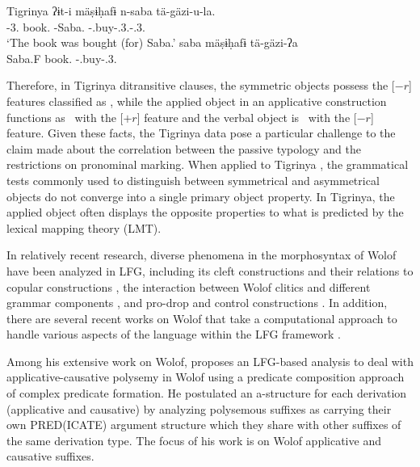 \documentclass[output=paper,hidelinks]{langscibook}
\begin{document}
\ea\label{ex:African:30} Tigrinya
\ea\label{ex:African:30a}
    \gll  ʔɨt-i mäṣɨḥafɨ n-saba tä-gäzi-u-la.\\
      {\DEF}-3{\M.\SG} book.{\SG}   \OBL-Saba.{\F}    {\PASS}-{\PRF}.buy-.3{\M.\SG}-.3{\F.\SG}  \\
    \glt ‘The book was bought (for) Saba.’
\ex\label{ex:African:30b}
     \gll *saba mäṣɨḥafɨ tä-gäzi-ʔa\\
     Saba.F book.{\SG}   {\PASS}-{\PRF}.buy-.3{\F.\SG}\\
\z
\z

Therefore, in Tigrinya ditransitive clauses, the symmetric objects possess the [$-r$] features classified as , while the applied object in an applicative construction functions as \OBJTHETA\ with the [$+r$] feature and  the verbal object is \OBJ\ with the [$-r$] feature. Given these facts, the Tigrinya data pose a particular challenge to the claim made about the correlation between the passive typology and the restrictions on pronominal marking. When applied to Tigrinya \citep{Kifle11}, the grammatical tests commonly used to distinguish between symmetrical and asymmetrical objects do not converge into a single primary object property. In Tigrinya, the applied object often displays the opposite properties to what is predicted by the lexical mapping theory (LMT). 


In relatively recent research, diverse phenomena in the morphosyntax of Wolof have been analyzed in LFG, including its cleft constructions and their relations to copular constructions \citep{Dione12}, the interaction between Wolof clitics and different grammar components \citep{dione2013handling}, and pro-drop and control constructions \citep{Dione19Clause}. In addition, there are several recent works on Wolof that take a computational approach to handle various aspects of the language within the LFG framework \citep{Dione:Disambiguation,Dione:Pruning,Dione:Finite,Dione2020}.

Among his extensive work on Wolof, \citet{Dione2013} proposes an LFG-based analysis to deal with applicative-causative polysemy in Wolof using a predicate composition approach of complex predicate formation. He postulated an a-structure for each derivation (applicative and causative) by analyzing polysemous suffixes as carrying their own PRED(ICATE) argument structure which they share with other suffixes of the same derivation type. The focus of his work is on Wolof applicative and causative suffixes.
\end{document}
